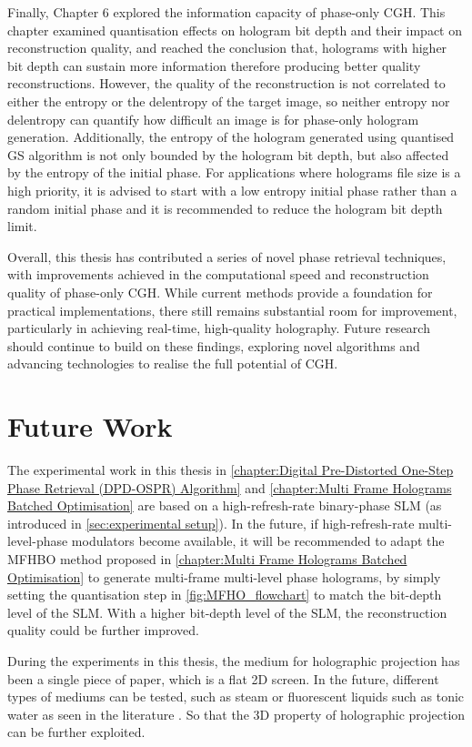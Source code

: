 Finally, Chapter 6 explored the information capacity of phase-only CGH. This chapter examined quantisation effects on hologram bit depth and their impact on reconstruction quality, and reached the conclusion that, holograms with higher bit depth can sustain more information therefore producing better quality reconstructions. However, the quality of the reconstruction is not correlated to either the entropy or the delentropy of the target image, so neither entropy nor delentropy can quantify how difficult an image is for phase-only hologram generation. Additionally, the entropy of the hologram generated using quantised GS algorithm is not only bounded by the hologram bit depth, but also affected by the entropy of the initial phase. For applications where holograms file size is a high priority, it is advised to start with a low entropy initial phase rather than a random initial phase and it is recommended to reduce the hologram bit depth limit.

Overall, this thesis has contributed a series of novel phase retrieval techniques, with improvements achieved in the computational speed and reconstruction quality of phase-only CGH. While current methods provide a foundation for practical implementations, there still remains substantial room for improvement, particularly in achieving real-time, high-quality holography. Future research should continue to build on these findings, exploring novel algorithms and advancing technologies to realise the full potential of CGH.

\section{Future Work}
The experimental work in this thesis in \cref{chapter:Digital Pre-Distorted One-Step Phase Retrieval (DPD-OSPR) Algorithm} and \cref{chapter:Multi Frame Holograms Batched Optimisation} are based on a high-refresh-rate binary-phase SLM (as introduced in \cref{sec:experimental setup}). In the future, if high-refresh-rate multi-level-phase modulators become available, it will be recommended to adapt the MFHBO method proposed in \cref{chapter:Multi Frame Holograms Batched Optimisation} to generate multi-frame multi-level phase holograms, by simply setting the quantisation step in \cref{fig:MFHO_flowchart} to match the bit-depth level of the SLM. With a higher bit-depth level of the SLM, the reconstruction quality could be further improved.

During the experiments in this thesis, the medium for holographic projection has been a single piece of paper, which is a flat 2D screen. In the future, different types of mediums can be tested, such as steam or fluorescent liquids such as tonic water as seen in the literature \cite{Makowski2019}. So that the 3D property of holographic projection can be further exploited.

